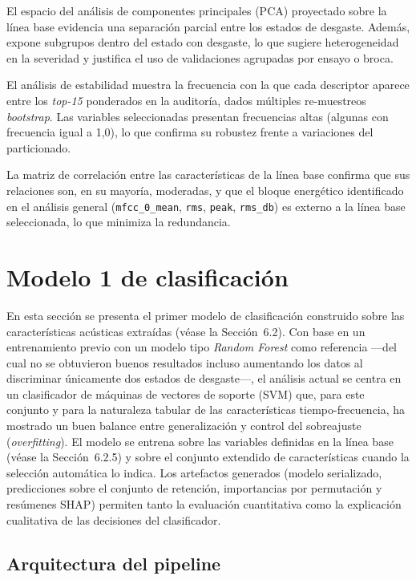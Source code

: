 \documentclass[12pt, letterpaper]{report}
\begin{document}
El espacio del análisis de componentes principales (PCA) proyectado sobre la línea base evidencia una separación parcial entre los estados de desgaste. Además, expone subgrupos dentro del estado con desgaste, lo que sugiere heterogeneidad en la severidad y justifica el uso de validaciones agrupadas por ensayo o broca.

El análisis de estabilidad muestra la frecuencia con la que cada descriptor aparece entre los \textit{top-15} ponderados en la auditoría, dados múltiples re-muestreos \textit{bootstrap}. Las variables seleccionadas presentan frecuencias altas (algunas con frecuencia igual a 1{,}0), lo que confirma su robustez frente a variaciones del particionado.

La matriz de correlación entre las características de la línea base confirma que sus relaciones son, en su mayoría, moderadas, y que el bloque energético identificado en el análisis general (\texttt{mfcc\_0\_mean}, \texttt{rms}, \texttt{peak}, \texttt{rms\_db}) es externo a la línea base seleccionada, lo que minimiza la redundancia.

\section{Modelo 1 de clasificación}

En esta sección se presenta el primer modelo de clasificación construido sobre las características acústicas extraídas (véase la Sección~6.2). Con base en un entrenamiento previo con un modelo tipo \textit{Random Forest} como referencia ---del cual no se obtuvieron buenos resultados incluso aumentando los datos al discriminar únicamente dos estados de desgaste---, el análisis actual se centra en un clasificador de máquinas de vectores de soporte (SVM) que, para este conjunto y para la naturaleza tabular de las características tiempo-frecuencia, ha mostrado un buen balance entre generalización y control del sobreajuste (\textit{overfitting}). El modelo se entrena sobre las variables definidas en la línea base (véase la Sección~6.2.5) y sobre el conjunto extendido de características cuando la selección automática lo indica. Los artefactos generados (modelo serializado, predicciones sobre el conjunto de retención, importancias por permutación y resúmenes SHAP) permiten tanto la evaluación cuantitativa como la explicación cualitativa de las decisiones del clasificador.

\subsection{Arquitectura del pipeline}
\end{document}
